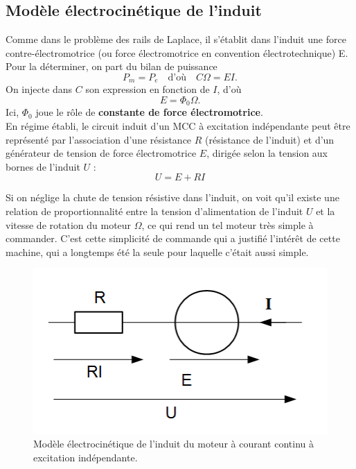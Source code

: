 \documentclass[11pt,a4paper]{report}
\begin{document}
\subsection{Modèle électrocinétique de l'induit}

Comme dans le problème des rails de Laplace, il s'établit dans l'induit une force contre-électromotrice (ou force électromotrice en convention électrotechnique) E. Pour la déterminer, on part du bilan de puissance
\begin{equation}
	P_m = P_e \quad\text{d'où}\quad C\Omega = EI.
\end{equation}
On injecte dans $C$ son expression en fonction de $I$, d'où
\begin{equation}
	\boxed{E = \Phi_0 \Omega}.
\end{equation}
Ici, $\Phi_0$ joue le rôle de \textbf{constante de force électromotrice}.\\

En régime établi, le circuit induit d'un MCC à excitation indépendante peut être représenté par l'association d'une résistance $R$ (résistance de l'induit) et d'un générateur de tension de force électromotrice $E$, dirigée selon la tension aux bornes de l'induit $U$ :
\begin{equation}
	U = E + R I
\end{equation}

Si on néglige la chute de tension résistive dans l'induit, on voit qu'il existe une relation de proportionnalité entre la tension d'alimentation de l'induit $U$ et la vitesse de rotation du moteur $\Omega$, ce qui rend un tel moteur très simple à commander. C'est cette simplicité de commande qui a justifié l'intérêt de cette machine, qui a longtemps été la seule pour laquelle c'était aussi simple.\\ 

\begin{figure}[h!]
	\begin{center}
		\includegraphics[scale=0.5]{mcc_modele.png}
	\end{center}
	\caption{Modèle électrocinétique de l'induit du moteur à courant continu 
	à excitation indépendante.}
	\label{ref:mcc_modele}
\end{figure}
\end{document}

